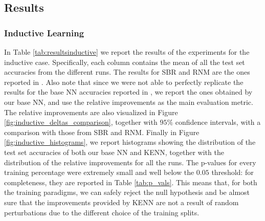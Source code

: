 \subsection{Results}
\subsubsection{Inductive Learning}

In Table \ref{tab:resultsinductive} we report the results of the experiments for the inductive case. Specifically, each column contains the mean of all the test set accuracies from the different runs. The results for SBR and RNM are the ones reported in \cite{marra2020relational}. Also note that since we were not able to perfectly replicate the results for the base NN accuracies reported in \cite{marra2020relational}, we report the ones obtained by our base NN, and use the relative improvements as the main evaluation metric.
The relative improvements are also visualized in Figure \ref{fig:inductive_deltas_comparison}, together with $95\%$ confidence intervals, with a comparison with those from SBR and RNM. Finally in Figure \ref{fig:inductive_histograms}, we report histograms showing the distribution of the test set accuracies of both our base NN and KENN, together with the distribution of the relative improvements for all the runs.
The p-values for every training percentage were extremely small and well below the $0.05$ threshold: for completeness, they are reported in Table \ref{tab:p_vals}. This means that, for both the training paradigms, we can safely reject the null hypothesis and be almost sure that the improvements provided by KENN are not a result of random perturbations due to the different choice of the training splits.
